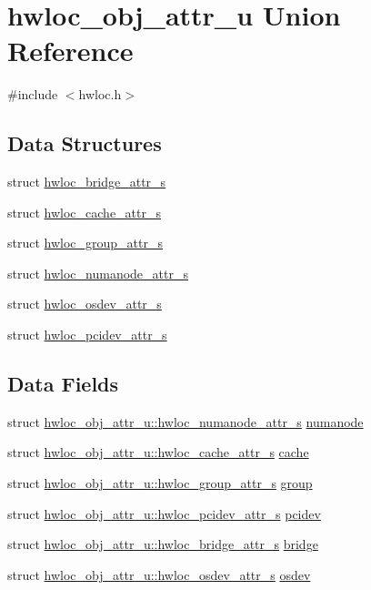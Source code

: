 \hypertarget{a00242}{}\section{hwloc\+\_\+obj\+\_\+attr\+\_\+u Union Reference}
\label{a00242}


{\ttfamily \#include $<$hwloc.\+h$>$}

\subsection*{Data Structures}
\begin{DoxyCompactItemize}
\item 
struct \hyperlink{a00266}{hwloc\+\_\+bridge\+\_\+attr\+\_\+s}
\item 
struct \hyperlink{a00254}{hwloc\+\_\+cache\+\_\+attr\+\_\+s}
\item 
struct \hyperlink{a00258}{hwloc\+\_\+group\+\_\+attr\+\_\+s}
\item 
struct \hyperlink{a00246}{hwloc\+\_\+numanode\+\_\+attr\+\_\+s}
\item 
struct \hyperlink{a00282}{hwloc\+\_\+osdev\+\_\+attr\+\_\+s}
\item 
struct \hyperlink{a00262}{hwloc\+\_\+pcidev\+\_\+attr\+\_\+s}
\end{DoxyCompactItemize}
\subsection*{Data Fields}
\begin{DoxyCompactItemize}
\item 
struct \hyperlink{a00246}{hwloc\+\_\+obj\+\_\+attr\+\_\+u\+::hwloc\+\_\+numanode\+\_\+attr\+\_\+s} \hyperlink{a00242_a6daa8729a68a637e6c80e94361314a87}{numanode}
\item 
struct \hyperlink{a00254}{hwloc\+\_\+obj\+\_\+attr\+\_\+u\+::hwloc\+\_\+cache\+\_\+attr\+\_\+s} \hyperlink{a00242_ab5a8ae3bf490e6b1071fea53f7382836}{cache}
\item 
struct \hyperlink{a00258}{hwloc\+\_\+obj\+\_\+attr\+\_\+u\+::hwloc\+\_\+group\+\_\+attr\+\_\+s} \hyperlink{a00242_ae4ba157cc313e2cdd9a82f1c1df7aaa6}{group}
\item 
struct \hyperlink{a00262}{hwloc\+\_\+obj\+\_\+attr\+\_\+u\+::hwloc\+\_\+pcidev\+\_\+attr\+\_\+s} \hyperlink{a00242_a4203d713ce0f5beaa6ee0e9bdac70828}{pcidev}
\item 
struct \hyperlink{a00266}{hwloc\+\_\+obj\+\_\+attr\+\_\+u\+::hwloc\+\_\+bridge\+\_\+attr\+\_\+s} \hyperlink{a00242_adbdf280699dd84c7619cd8d9edc0d958}{bridge}
\item 
struct \hyperlink{a00282}{hwloc\+\_\+obj\+\_\+attr\+\_\+u\+::hwloc\+\_\+osdev\+\_\+attr\+\_\+s} \hyperlink{a00242_a22904c25fe44b323bab5c9bc52660fca}{osdev}
\end{DoxyCompactItemize}


